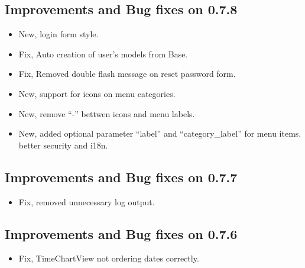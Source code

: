 \documentclass[letterpaper,10pt,english]{sphinxmanual}
\begin{document}
\subsection{Improvements and Bug fixes on 0.7.8}
\label{versions:improvements-and-bug-fixes-on-0-7-8}\begin{itemize}
\item {} 
New, login form style.

\item {} 
Fix, Auto creation of user's models from Base.

\item {} 
Fix, Removed double flash message on reset password form.

\item {} 
New, support for icons on menu categories.

\item {} 
New, remove ``-'' bettwen icons and menu labels.

\item {} 
New, added optional parameter ``label'' and ``category\_label'' for menu items. better security and i18n.

\end{itemize}


\subsection{Improvements and Bug fixes on 0.7.7}
\label{versions:improvements-and-bug-fixes-on-0-7-7}\begin{itemize}
\item {} 
Fix, removed unnecessary log output.

\end{itemize}


\subsection{Improvements and Bug fixes on 0.7.6}
\label{versions:improvements-and-bug-fixes-on-0-7-6}\begin{itemize}
\item {} 
Fix, TimeChartView not ordering dates correctly.

\end{itemize}
\end{document}
